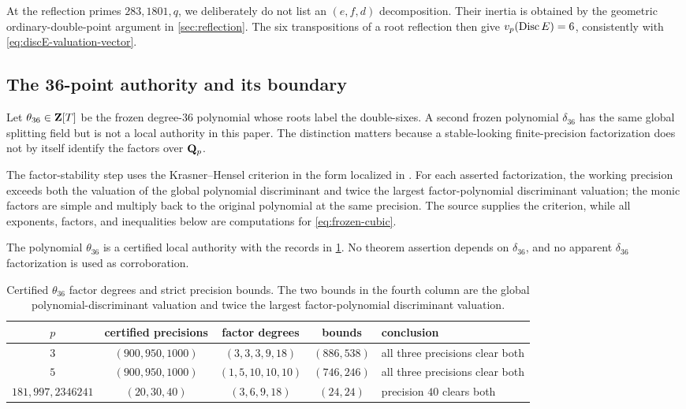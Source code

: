 At the reflection primes $283,1801,q$, we deliberately do not list an
$(e,f,d)$ decomposition.  Their inertia is obtained by the geometric
ordinary-double-point argument in \cref{sec:reflection}.  The six
transpositions of a root reflection then give $v_p(\operatorname{Disc} E)=6$,
consistently with \cref{eq:discE-valuation-vector}.

\subsection{The 36-point authority and its boundary}

Let $\theta_{36}\in\mathbf{Z}[T]$ be the frozen degree-$36$ polynomial whose roots
label the double-sixes.  A second frozen polynomial $\delta_{36}$ has the
same global splitting field but is not a local authority in this paper.  The
distinction matters because a stable-looking finite-precision factorization
does not by itself identify the factors over $\mathbf{Q}_p$.

The factor-stability step uses the Krasner--Hensel criterion in the form
localized in \citet[Chapter II, \S2, Exercises 1--2, p.~30]
{serre1979local}.  For each asserted factorization, the working precision
exceeds both the valuation of the global polynomial discriminant and twice
the largest factor-polynomial discriminant valuation; the monic factors are
simple and multiply back to the original polynomial at the same precision.
The source supplies the criterion, while all exponents, factors, and
inequalities below are computations for \cref{eq:frozen-cubic}.

\begin{proposition}
\label{prop:theta-authority}
The polynomial $\theta_{36}$ is a certified local authority with the records
in \cref{tab:theta-authority}.  No theorem assertion depends on
$\delta_{36}$, and no apparent $\delta_{36}$ factorization is used as
corroboration.
\end{proposition}

\begin{table}[ht]
\centering
\caption{Certified $\theta_{36}$ factor degrees and strict precision bounds.
The two bounds in the fourth column are the global
polynomial-discriminant valuation and twice the largest factor-polynomial
discriminant valuation.}
\label{tab:theta-authority}
\small
\begin{tabularx}{\textwidth}{@{}c c c c >{\raggedright\arraybackslash}X@{}}
\toprule
$p$&certified precisions&factor degrees&bounds&conclusion\\
\midrule
$3$&$(900,950,1000)$&$(3,3,3,9,18)$&$(886,538)$&
all three precisions clear both\\
$5$&$(900,950,1000)$&$(1,5,10,10,10)$&$(746,246)$&
all three precisions clear both\\
$181,997,2346241$&$(20,30,40)$&$(3,6,9,18)$&$(24,24)$&
precision $40$ clears both\\
\bottomrule
\end{tabularx}
\end{table}

